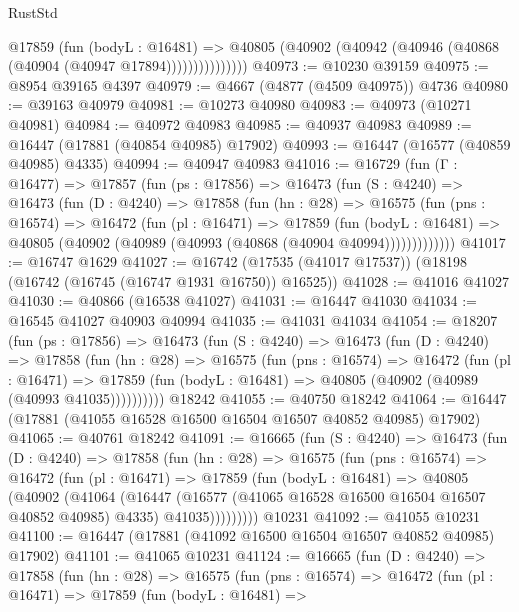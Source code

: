 \begin{lexlean}{RustStd}
\begin{coremodule}
                  @17859
                    (fun (bodyL : @16481) =>
                    @40805 (@40902 (@40942 (@40946 (@40868 (@40904 (@40947 @17894)))))))))))))))
@40973 := @10230 @39159
@40975 := @8954 @39165 @4397
@40979 := @4667 (@4877 (@4509 @40975)) @4736
@40980 := @39163 @40979
@40981 := @10273 @40980
@40983 := @40973 (@10271 @40981)
@40984 := @40972 @40983
@40985 := @40937 @40983
@40989 := @16447 (@17881 (@40854 @40985) @17902)
@40993 := @16447 (@16577 (@40859 @40985) @4335)
@40994 := @40947 @40983
@41016 := @16729
    (fun (Γ : @16477) =>
    @17857
      (fun (ps : @17856) =>
      @16473
        (fun (S : @4240) =>
        @16473
          (fun (D : @4240) =>
          @17858
            (fun (hn : @28) =>
            @16575
              (fun (pns : @16574) =>
              @16472
                (fun (pl : @16471) =>
                @17859
                  (fun (bodyL : @16481) =>
                  @40805 (@40902 (@40989 (@40993 (@40868 (@40904 @40994)))))))))))))
@41017 := @16747 @1629
@41027 := @16742 (@17535 (@41017 @17537)) (@18198 (@16742 (@16745 (@16747 @1931 @16750)) @16525))
@41028 := @41016 @41027
@41030 := @40866 (@16538 @41027)
@41031 := @16447 @41030
@41034 := @16545 @41027 @40903 @40994
@41035 := @41031 @41034
@41054 := @18207
    (fun (ps : @17856) =>
    @16473
      (fun (S : @4240) =>
      @16473
        (fun (D : @4240) =>
        @17858
          (fun (hn : @28) =>
          @16575
            (fun (pns : @16574) =>
            @16472
              (fun (pl : @16471) =>
              @17859 (fun (bodyL : @16481) => @40805 (@40902 (@40989 (@40993 @41035))))))))))
    @18242
@41055 := @40750 @18242
@41064 := @16447 (@17881 (@41055 @16528 @16500 @16504 @16507 @40852 @40985) @17902)
@41065 := @40761 @18242
@41091 := @16665
    (fun (S : @4240) =>
    @16473
      (fun (D : @4240) =>
      @17858
        (fun (hn : @28) =>
        @16575
          (fun (pns : @16574) =>
          @16472
            (fun (pl : @16471) =>
            @17859
              (fun (bodyL : @16481) =>
              @40805
                (@40902
                  (@41064
                    (@16447
                      (@16577 (@41065 @16528 @16500 @16504 @16507 @40852 @40985) @4335)
                      @41035)))))))))
    @10231
@41092 := @41055 @10231
@41100 := @16447 (@17881 (@41092 @16500 @16504 @16507 @40852 @40985) @17902)
@41101 := @41065 @10231
@41124 := @16665
    (fun (D : @4240) =>
    @17858
      (fun (hn : @28) =>
      @16575
        (fun (pns : @16574) =>
        @16472
          (fun (pl : @16471) =>
          @17859
            (fun (bodyL : @16481) =>

\end{coremodule}
\end{lexlean}
